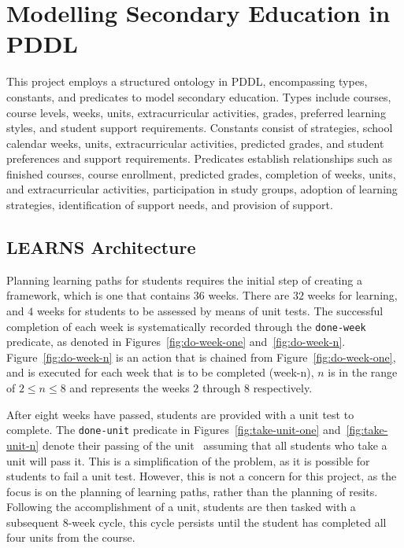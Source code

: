 \section{Modelling Secondary Education in PDDL}
This project employs a structured ontology in PDDL, encompassing types, constants, and predicates to model secondary education. Types include courses, course levels, weeks, units, extracurricular activities, grades, preferred learning styles, and student support requirements. Constants consist of strategies, school calendar weeks, units, extracurricular activities, predicted grades, and student preferences and support requirements. Predicates establish relationships such as finished courses, course enrollment, predicted grades, completion of weeks, units, and extracurricular activities, participation in study groups, adoption of learning strategies, identification of support needs, and provision of support.

\subsection{LEARNS Architecture}
Planning learning paths for students requires the initial step of creating a framework, which is one that contains 36 weeks. There are $32$ weeks for learning, and $4$ weeks for students to be assessed by means of unit tests. The successful completion of each week is systematically recorded through the \texttt{done-week} predicate, as denoted in Figures~\ref{fig:do-week-one} and~\ref{fig:do-week-n}. Figure~\ref{fig:do-week-n} is an action that is chained from Figure~\ref{fig:do-week-one}, and is executed for each week that is to be completed (week-n), $n$ is in the range of $2 \leq n \leq 8$ and represents the weeks $2$ through $8$ respectively.




After eight weeks have passed, students are provided with a unit test to complete. The \texttt{done-unit} predicate in Figures~\ref{fig:take-unit-one} and~\ref{fig:take-unit-n} denote their passing of the unit \textemdash~assuming that all students who take a unit will pass it. This is a simplification of the problem, as it is possible for students to fail a unit test. However, this is not a concern for this project, as the focus is on the planning of learning paths, rather than the planning of resits. Following the accomplishment of a unit, students are then tasked with a subsequent 8-week cycle, this cycle persists until the student has completed all four units from the course.

